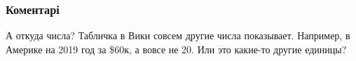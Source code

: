  
 
 
 
 
\subsubsection{Коментарі}

\begin{itemize}
 

А откуда числа? Табличка в Вики совсем другие числа показывает. Например, в
Америке на 2019 год за \$60к, а вовсе не 20. Или это какие-то другие единицы?

\end{itemize}

